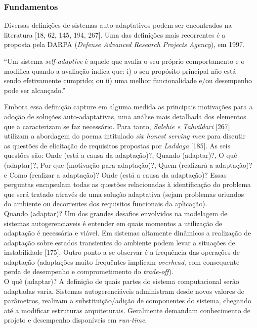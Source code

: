 \documentclass[conference]{IEEEtran}
\begin{document}
\subsubsection{Fundamentos}

Diversas definições de sistemas auto-adaptativos podem ser encontrados na literatura [18, 62, 145, 194, 267]. Uma das definições mais recorrentes é a proposta pela DARPA (\textit{Defense Advanced Research Projects Agency}), em 1997.

“Um sistema \textit{self-adaptive} é aquele que avalia o seu próprio comportamento e o modifica quando a avaliação indica que: i) o seu propósito principal não está sendo efetivamente cumprido; ou ii) uma melhor funcionalidade e/ou desempenho pode ser alcançado.”

Embora essa definição capture em alguma medida as principais motivações para a adoção de soluções auto-adaptativas, uma análise mais detalhada dos elementos que a caracterizam se faz necessário. Para tanto, \textit{Salehie e Tahvildari} [267] utilizam a abordagem do poema intitulado \textit{six honest serving men} para discutir as questões de elicitação de requisitos propostas por \textit{Laddaga} [185]. As seis questões são: Onde (está a causa da adaptação)?, Quando (adaptar)?, O quê (adaptar)?, Por que (motivação para adaptação)?, Quem (realizará a adaptação)? e Como (realizar a adaptação)?
Onde (está a causa da adaptação)? Essas perguntas encapsulam todas as questões relacionadas à identificação do problema que será tratado através de uma solução adaptativa (sejam problemas oriundos do ambiente ou decorrentes dos requisitos funcionais da aplicação).\\
Quando (adaptar)? Um dos grandes desafios envolvidos na modelagem de sistemas autogerenciaveis é entender em quais momentos a utilização de adaptação é necessária e viável. Em sistemas altamente dinâmicos a realização de adaptação sobre estados transientes do ambiente podem levar a situações de instabilidade [175]. Outro ponto a se observar é a frequência das operações de adaptação (adaptações muito frequêntes implicam \textit{overhead}, com consequente perda de desempenho e comprometimento do \textit{trade-off}).\\
O quê (adaptar)? A definição de quais partes do sistema computacional serão adaptadas varia. Sistemas autogerenciáveis administram desde novos valores de parâmetros, realizam a substituição/adição de componentes do sistema, chegando até a modificar estruturas arquiteturais. Geralmente demandam conhecimento de projeto e desempenho disponíveis em \textit{run-time}.\\
\end{document}
